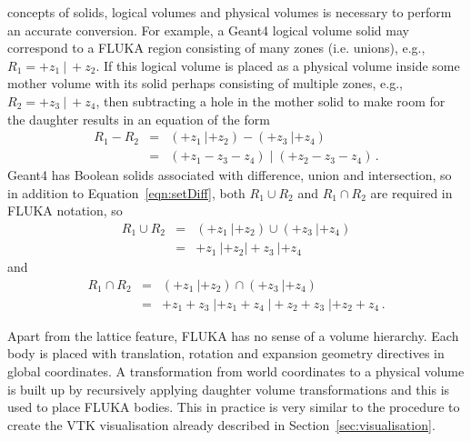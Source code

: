 \documentclass[final,5p,times,twocolumn]{elsarticle}
\begin{document}
concepts of solids, logical volumes and physical volumes is necessary
to perform an accurate conversion.  For example, a Geant4 logical volume
solid may correspond to a FLUKA region consisting of many zones
(i.e. unions), e.g.,~$R_1 = +z_1\: |~+z_2$.  If this logical volume is
placed as a physical volume inside some mother volume with its solid
perhaps consisting of multiple zones, e.g., $R_2= +z_3 \: |~+z_4$, then
subtracting a hole in the mother solid to make room for the daughter
results in an equation of the form
\begin{equation}
  \begin{aligned}
R_1 - R_2 	& = & (+z_1 \: | +z_2) - ( +z_3 \: | +z_4) 			\\
			& = & (+z_1 - z_3 - z_4) \;  | \; (+z_2 - z_3 - z_4)\,.
\label{eqn:setDiff}
  \end{aligned}
\end{equation}
Geant4 has Boolean solids associated with difference, union and intersection, so in addition to
Equation~\ref{eqn:setDiff}, both $R_1 \cup R_2$ and $R_1 \cap R_2$ are required in FLUKA notation, so
\begin{equation}
  \begin{aligned}
R_1 \cup R_2 	& = & (+z_1 \: | +z_2)  \cup ( +z_3 \: | +z_4) \\
			& = & +z_1 \: | +z_2 |  +z_3 \: | +z_4
\label{eqn:setUnion}
\end{aligned}
\end{equation}
and
\begin{equation}
  \begin{aligned}
    R_1 \cap R_2 	& = & (+z_1 \: | +z_2) \cap ( +z_3 \: | +z_4) \\
			& = & +z_1 +z_3  \; | +z_1 +z_4 \; | +z_2 +z_3 \; | +z_2 +z_4\,.
  \end{aligned}
\label{eqn:setIntersection}
\end{equation}

Apart from the lattice feature, FLUKA has no sense of a volume hierarchy. Each body is placed with
translation, rotation and expansion geometry directives in global coordinates. A transformation from world
coordinates to a physical volume is built up by recursively applying daughter volume transformations
and  this is used to place FLUKA bodies. This  in practice is very similar to the procedure to create the
VTK visualisation already described in Section~\ref{sec:visualisation}.
\end{document}
